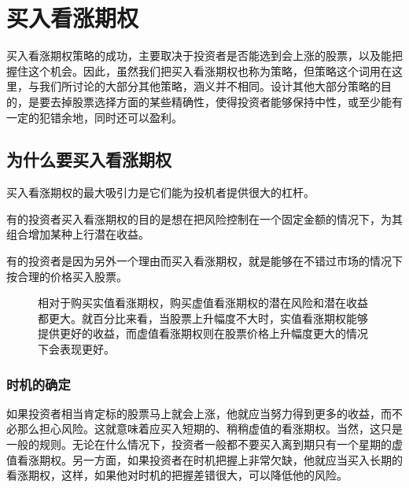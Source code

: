 \chapter{买入看涨期权}
买入看涨期权策略的成功，主要取决于投资者是否能选到会上涨的股票，以及能把握住这个机会。因此，虽然我们把买入看涨期权也称为策略，但策略这个词用在这里，与我们所讨论的大部分其他策略，涵义并不相同。设计其他大部分策略的目的，是要去掉股票选择方面的某些精确性，使得投资者能够保持中性，或至少能有一定的犯错余地，同时还可以盈利。
\section{为什么要买入看涨期权}
买入看涨期权的最大吸引力是它们能为投机者提供很大的杠杆。

有的投资者买入看涨期权的目的是想在把风险控制在一个固定金额的情况下，为其组合增加某种上行潜在收益。

有的投资者是因为另外一个理由而买入看涨期权，就是能够在不错过市场的情况下按合理的价格买入股票。

\begin{figure}
    \centering
    \caption{相对于购买实值看涨期权，购买虚值看涨期权的潜在风险和潜在收益都更大。就百分比来看，当股票上升幅度不大时，实值看涨期权能够提供更好的收益，而虚值看涨期权则在股票价格上升幅度更大的情况下会表现更好。}
    \label{fig3.1}
\end{figure}
\subsection{时机的确定}
如果投资者相当肯定标的股票马上就会上涨，他就应当努力得到更多的收益，而不必那么担心风险。这就意味着应买入短期的、稍稍虚值的看涨期权。当然，这只是一般的规则。无论在什么情况下，投资者一般都不要买入离到期只有一个星期的虚值看涨期权。另一方面，如果投资者在时机把握上非常欠缺，他就应当买入长期的看涨期权，这样，如果他对时机的把握差错很大，可以降低他的风险。


